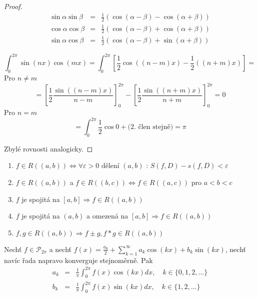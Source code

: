 \begin{proof}

\begin{eqnarray}
\sin \alpha \sin \beta & = & \frac{1}{2} \left( \cos (\alpha - \beta) - \cos (\alpha + \beta) \right) \nonumber\\
\cos \alpha \cos \beta & = & \frac{1}{2} \left( \cos (\alpha - \beta) + \cos (\alpha + \beta) \right) \nonumber\\
\sin \alpha \cos \beta & = & \frac{1}{2} \left( \cos (\alpha - \beta) + \sin (\alpha + \beta) \right) \nonumber
\end{eqnarray}

$$\int_{0}^{2 \pi} \sin (nx) \cos(mx) = \int_{0}^{2 \pi} \left[ \frac{1}{2} \cos \left( (n-m)x \right) - \frac{1}{2} \left( (n+m)x \right) \right] = $$
Pro $n \neq m$
$$= \left[ \frac{1}{2} \frac{\sin \left( (n-m)x \right)}{n-m} \right]_{0}^{2 \pi} - \left[ \frac{1}{2} \frac{\sin \left( (n+m)x \right)}{n+m} \right]_{0}^{2 \pi} = 0$$
Pro $n=m$
$$=\int_{0}^{2 \pi} \frac{1}{2} \cos 0 + \textrm{(2. člen stejně)} = \pi$$

Zbylé rovnosti analogicky.
\end{proof}\begin{opakovani} \quad
\begin{enumerate}
\item $f \in R((a,b)) \Leftrightarrow \forall \varepsilon > 0 \textrm{ dělení } (a,b)$ : $S(f,D) -s(f,D) < \varepsilon$
\item $f \in R((a,b))$ a $f \in R((b,c)) \Leftrightarrow f \in R((a,c))$ pro $a<b<c$
\item $f$ je spojitá na $[a,b] \Rightarrow f \in R((a,b))$
\item $f$ je spojitá na $(a,b)$ a omezená na $[a,b] \Rightarrow f \in R((a,b))$
\item $f, g \in R((a,b)) \Rightarrow f \pm g, f * g \in R((a,b))$
\end{enumerate}
\end{opakovani}

\begin{vetal}
Nechť $f \in \mathcal{P}_{2 \pi}$ a nechť $f(x) = \frac{a_0}{2} + \sum_{k=1}^{\infty} a_k \cos(kx) + b_k \sin(kx)$, nechť navíc řada napravo konverguje stejnoměrně. Pak
\begin{eqnarray}
a_k & = & \frac{1}{\pi} \int_0^{2 \pi} f(x) \cos(kx) dx, \quad k \in \{0, 1, 2, \ldots\} \nonumber\\
b_k & = & \frac{1}{\pi} \int_0^{2 \pi} f(x) \sin(kx) dx, \quad k \in \{1, 2, \ldots\} \nonumber
\end{eqnarray}
\end{vetal}

